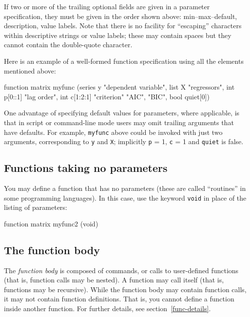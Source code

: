 If two or more of the trailing optional fields are given in a
parameter specification, they must be given in the order shown above:
min--max--default, description, value labels. Note that there is no
facility for ``escaping'' characters within descriptive strings or
value labels; these may contain spaces but they cannot contain the
double-quote character.  

Here is an example of a well-formed function specification using all
the elements mentioned above:
%
\begin{code}
function matrix myfunc (series y "dependent variable",
                        list X "regressors",
                        int p[0::1] "lag order",
                        int c[1:2:1] "criterion" {"AIC", "BIC"},
                        bool quiet[0])
\end{code} 

One advantage of specifying default values for parameters, where
applicable, is that in script or command-line mode users may omit
trailing arguments that have defaults. For example, \texttt{myfunc}
above could be invoked with just two arguments, corresponding to
\texttt{y} and \texttt{X}; implicitly \texttt{p} = 1, \texttt{c} = 1
and \texttt{quiet} is false.

\subsection{Functions taking no parameters}

You may define a function that has no parameters (these are called
``routines'' in some programming languages).  In this case,  
use the keyword \texttt{void} in place of the listing of parameters:
%    
\begin{code}
function matrix myfunc2 (void)
\end{code}


\subsection{The function body}
   
The \textsl{function body} is composed of  commands, or
calls to user-defined functions (that is, function calls may be
nested).  A function may call itself (that is, functions may be
recursive). While the function body may contain function calls, it may
not contain function definitions.  That is, you cannot define a
function inside another function.  For further details, see
section~\ref{func-details}.


